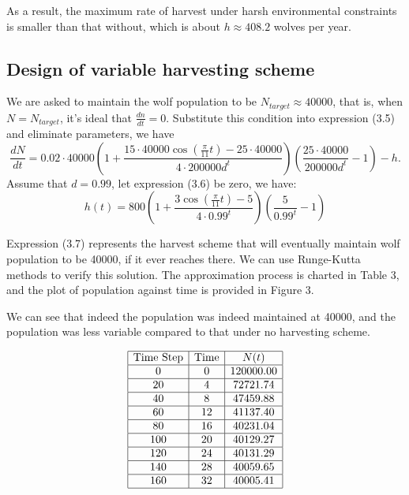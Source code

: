 \documentclass{amsart}
\theoremstyle{definition}
\theoremstyle{remark}
\numberwithin{equation}{section}
\begin{document}
As a result, the maximum rate of harvest under harsh environmental constraints is smaller than that without, which is about $h\approx 408.2$ wolves per year.

\subsection{Design of variable harvesting scheme} We are asked to maintain the wolf population to be $N_{target}\approx40000$, that is, when $N=N_{target}$, it's ideal that $\frac{dn}{dt}=0$.
Substitute this condition into expression (3.5) and eliminate parameters, we have
\begin{equation}
    \frac{dN}{dt}=0.02\cdot40000(1+\frac{15\cdot40000\cos(\frac{\pi}{11}t)-25\cdot40000}{4\cdot 200000d^t})(\frac{25\cdot40000}{200000d^t}-1)-h.
\end{equation}
Assume that $d=0.99$, let expression (3.6) be zero, we have:
\begin{equation}
    h(t)=800(1+\frac{3\cos(\frac{\pi}{11}t)-5}{4\cdot 0.99^t})(\frac{5}{0.99^t}-1)
\end{equation}

Expression (3.7) represents the harvest scheme that will eventually maintain wolf population to be 40000, if it ever reaches there. We can use Runge-Kutta methods to verify this solution. The approximation process is charted in Table 3, and the plot of population against time is provided in Figure 3.

We can see that indeed the population was indeed maintained at 40000, and the population was less variable compared to that under no harvesting scheme.


\begin{table}[ht]
\caption{}\label{eqtable}
\renewcommand\arraystretch{1.5}
\noindent\[
\begin{array}{|c|c|c|}
 \hline
  \text{Time Step}& \text{Time} & N(t) \\ 
  \hline
 0 & 0& 120000.00 \\ 
   \hline
20 & 4& 72721.74 \\ 
   \hline
40 & 8& 47459.88 \\ 
   \hline
60 & 12& 41137.40 \\ 
   \hline
80 & 16& 40231.04 \\ 
   \hline
100 & 20& 40129.27 \\ 
   \hline
120 & 24& 40131.29 \\ 
   \hline
140 & 28& 40059.65 \\ 
   \hline
160 & 32& 40005.41 \\ 
   \hline
\end{array}
\]
\end{table}
\end{document}

